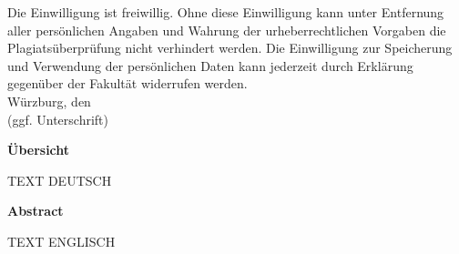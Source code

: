 \documentclass[ngerman,bt]{dbvdoc}
\begin{document}
Die Einwilligung ist freiwillig. Ohne diese Einwilligung kann unter Entfernung aller persönlichen
Angaben und Wahrung der urheberrechtlichen Vorgaben die Plagiatsüberprüfung nicht verhindert
werden. Die Einwilligung zur Speicherung und Verwendung der persönlichen Daten kann jederzeit
durch Erklärung gegenüber der Fakultät widerrufen werden.\\[5mm]
Würzburg, den\\[20mm]
(ggf. Unterschrift)

\clearpage

\begin{center}
\bf Übersicht
\end{center}
TEXT DEUTSCH


\vfill
\begin{center}
\bf Abstract
\end{center}
TEXT ENGLISCH

\vfill
\cleardoublepage

\tableofcontents

\cleardoublepage {}


\cleardoublepage

\cleardoublepage

\cleardoublepage

\cleardoublepage
%   
\nocite{*}  %
% 
% 

\printbibliography
\cleardoublepage

\listoffigures\cleardoublepage

\listoftables\cleardoublepage
\end{document}
